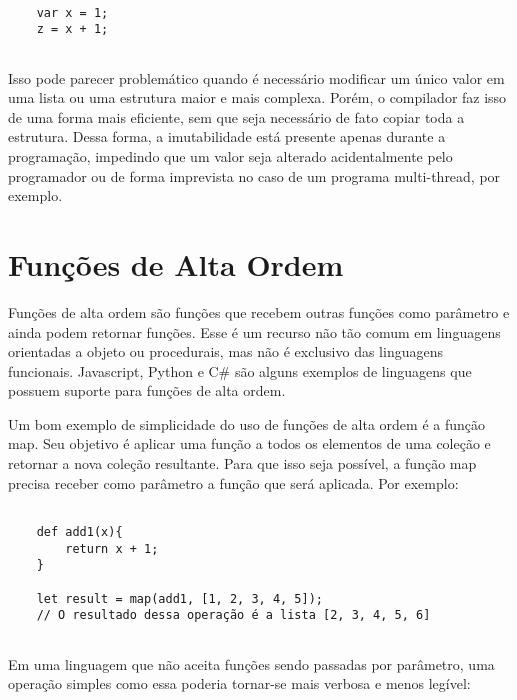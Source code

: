 \begin{lstlisting}[caption={Exemplo de Código Imutável},label=imutablevar]

    var x = 1;
    z = x + 1;


\end{lstlisting}

Isso pode parecer problemático quando é necessário 
modificar um único valor em uma lista ou uma estrutura 
maior e mais complexa. Porém, o compilador faz isso 
de uma forma mais eficiente, sem que seja 
necessário de fato copiar toda a estrutura\cite{functionalscala}. 
Dessa forma, a imutabilidade está presente apenas durante a 
programação, impedindo que um valor seja alterado 
acidentalmente pelo programador ou de forma imprevista 
no caso de um programa multi-thread, por exemplo.



\section{Funções de Alta Ordem}

Funções de alta ordem são funções que recebem 
outras funções como parâmetro e ainda podem 
retornar funções\cite{realworldhaskell, functionalscala}. 
Esse é um recurso 
não tão comum em linguagens orientadas a 
objeto ou procedurais, mas não é exclusivo das 
linguagens funcionais. Javascript\cite{eloquentjs}, 
Python\cite{denerocomposing} e C\#\cite{buonannofunctcsharp}
são alguns exemplos de linguagens que possuem suporte 
para funções de alta ordem.

Um bom exemplo de simplicidade do uso de 
funções de alta ordem é a função map\cite{hofscala}. Seu objetivo 
é aplicar uma função a todos os elementos de uma 
coleção e retornar a nova coleção resultante. 
Para que isso seja possível, a função map precisa 
receber como parâmetro a função que será aplicada. 
Por exemplo:

\begin{lstlisting}[caption={Exemplo de Função de Alta Ordem},label=hof]

    def add1(x){
        return x + 1;
    }

    let result = map(add1, [1, 2, 3, 4, 5]);
    // O resultado dessa operação é a lista [2, 3, 4, 5, 6]
        

\end{lstlisting}

Em uma linguagem que não aceita funções sendo 
passadas por parâmetro, uma operação simples como 
essa poderia tornar-se mais verbosa e menos legível:


